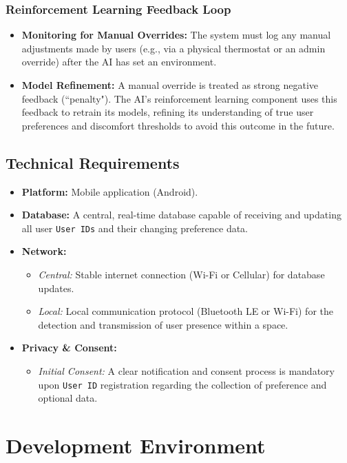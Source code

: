 \documentclass[conference]{IEEEtran}
\begin{document}
\subsubsection{Reinforcement Learning Feedback Loop}
\begin{itemize}
    \item \textbf{Monitoring for Manual Overrides:} The system must log any manual adjustments made by users (e.g., via a physical thermostat or an admin override) after the AI has set an environment.
    \item \textbf{Model Refinement:} A manual override is treated as strong negative feedback (``penalty"). The AI's reinforcement learning component uses this feedback to retrain its models, refining its understanding of true user preferences and discomfort thresholds to avoid this outcome in the future.
\end{itemize}

\subsection{Technical Requirements}
\begin{itemize}
    \item \textbf{Platform:} Mobile application (Android).
    \item \textbf{Database:} A central, real-time database capable of receiving and updating all user \texttt{User IDs} and their changing preference data.
    \item \textbf{Network:}
        \begin{itemize}
            \item \textit{Central:} Stable internet connection (Wi-Fi or Cellular) for database updates.
            \item \textit{Local:} Local communication protocol (Bluetooth LE or Wi-Fi) for the detection and transmission of user presence within a space.
        \end{itemize}
    \item \textbf{Privacy \& Consent:}
        \begin{itemize}
            \item \textit{Initial Consent:} A clear notification and consent process is mandatory upon \texttt{User ID} registration regarding the collection of preference and optional data.
        \end{itemize}
\end{itemize}


\section{Development Environment}
\end{document}
